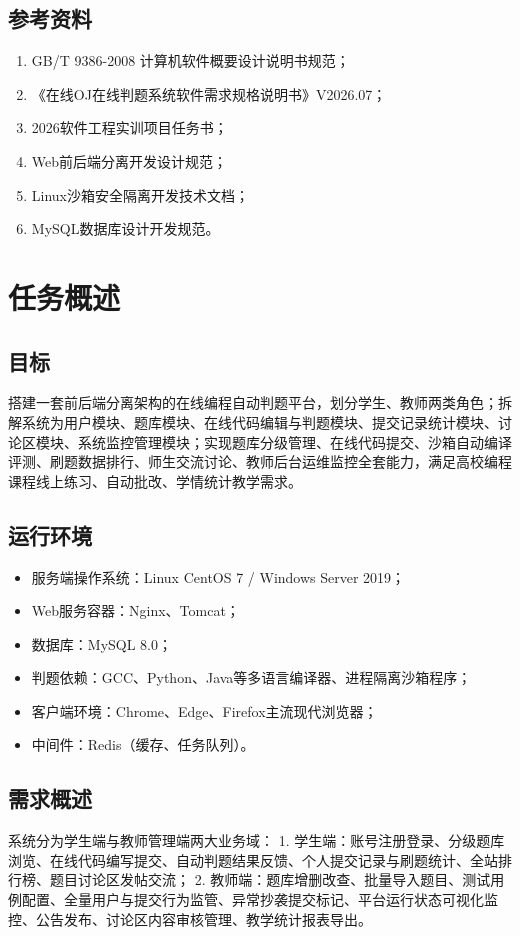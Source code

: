 \documentclass{../template/softeng}
\begin{document}
\subsection{参考资料}
\begin{enumerate}
    \item GB/T 9386-2008 计算机软件概要设计说明书规范；
    \item 《在线OJ在线判题系统软件需求规格说明书》V2026.07；
    \item 2026软件工程实训项目任务书；
    \item Web前后端分离开发设计规范；
    \item Linux沙箱安全隔离开发技术文档；
    \item MySQL数据库设计开发规范。
\end{enumerate}

\section{任务概述}
\subsection{目标}
搭建一套前后端分离架构的在线编程自动判题平台，划分学生、教师两类角色；拆解系统为用户模块、题库模块、在线代码编辑与判题模块、提交记录统计模块、讨论区模块、系统监控管理模块；实现题库分级管理、在线代码提交、沙箱自动编译评测、刷题数据排行、师生交流讨论、教师后台运维监控全套能力，满足高校编程课程线上练习、自动批改、学情统计教学需求。

\subsection{运行环境}
\begin{itemize}
    \item 服务端操作系统：Linux CentOS 7 / Windows Server 2019；
    \item Web服务容器：Nginx、Tomcat；
    \item 数据库：MySQL 8.0；
    \item 判题依赖：GCC、Python、Java等多语言编译器、进程隔离沙箱程序；
    \item 客户端环境：Chrome、Edge、Firefox主流现代浏览器；
    \item 中间件：Redis（缓存、任务队列）。
\end{itemize}

\subsection{需求概述}
系统分为学生端与教师管理端两大业务域：
1. 学生端：账号注册登录、分级题库浏览、在线代码编写提交、自动判题结果反馈、个人提交记录与刷题统计、全站排行榜、题目讨论区发帖交流；
2. 教师端：题库增删改查、批量导入题目、测试用例配置、全量用户与提交行为监管、异常抄袭提交标记、平台运行状态可视化监控、公告发布、讨论区内容审核管理、教学统计报表导出。
\end{document}

